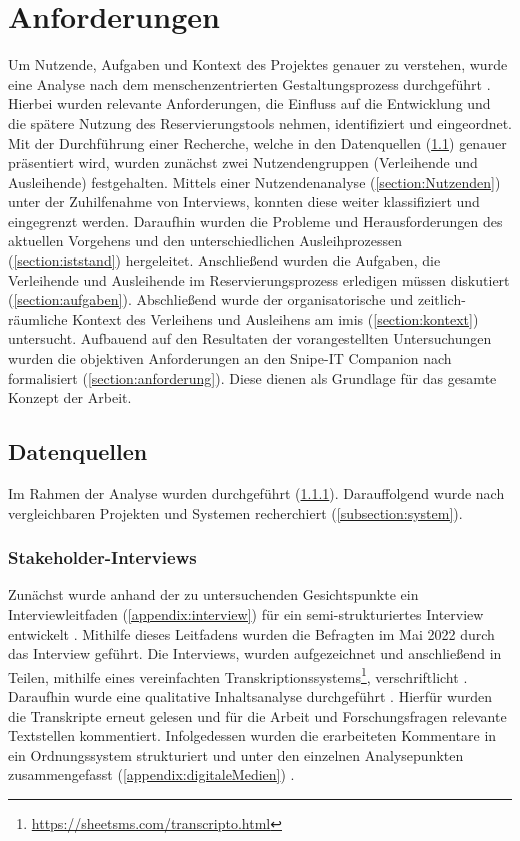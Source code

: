 \chapter{Anforderungen}
\label{chapter-analyse}

Um Nutzende, Aufgaben und Kontext des Projektes genauer zu verstehen, wurde eine
Analyse nach dem menschenzentrierten Gestaltungsprozess durchgeführt
\cite{DINISO9241}. Hierbei wurden relevante Anforderungen, die Einfluss auf die
Entwicklung und die spätere Nutzung des Reservierungstools nehmen, identifiziert
und eingeordnet. Mit der Durchführung einer Recherche, welche in den
Datenquellen (\ref{section:daten}) genauer präsentiert wird, wurden zunächst
zwei Nutzendengruppen (Verleihende und Ausleihende) festgehalten. Mittels einer
Nutzendenanalyse (\ref{section:Nutzenden}) unter der Zuhilfenahme von
Interviews, konnten diese weiter klassifiziert und eingegrenzt werden. Daraufhin
wurden die Probleme und Herausforderungen des aktuellen Vorgehens und den
unterschiedlichen Ausleihprozessen (\ref{section:iststand}) hergeleitet.
Anschließend wurden die Aufgaben, die Verleihende und Ausleihende im
Reservierungsprozess erledigen müssen diskutiert (\ref{section:aufgaben}).
Abschließend wurde der organisatorische und zeitlich-räumliche Kontext des
Verleihens und Ausleihens am \ac{imis} (\ref{section:kontext}) untersucht.
Aufbauend auf den Resultaten der vorangestellten Untersuchungen wurden die
objektiven Anforderungen an den Snipe-IT Companion nach 
formalisiert (\ref{section:anforderung}). Diese dienen als Grundlage für das
gesamte Konzept der Arbeit.

\section{Datenquellen}
\label{section:daten}
Im Rahmen der Analyse wurden  durchgeführt
(\ref{subsection:interview}). Darauffolgend wurde nach vergleichbaren Projekten
und Systemen recherchiert (\ref{subsection:system}).

\subsection{Stakeholder-Interviews}
\label{subsection:interview}
Zunächst wurde anhand der zu untersuchenden Gesichtspunkte ein Interviewleitfaden
(\ref{appendix:interview}) für ein semi-strukturiertes Interview entwickelt
\cite{blandford_qualitative_2016}. Mithilfe dieses Leitfadens wurden die Befragten im Mai 2022 durch
das Interview geführt. Die Interviews, wurden aufgezeichnet und anschließend in Teilen, mithilfe
eines vereinfachten Transkriptionssystems\footnote{\url{https://sheetsms.com/transcripto.html}},
verschriftlicht \cite{dresing_praxisbuch_2016}. Daraufhin wurde eine qualitative Inhaltsanalyse
durchgeführt \cite{dresing_praxisbuch_2016}. Hierfür wurden die Transkripte erneut gelesen und für
die Arbeit und Forschungsfragen relevante Textstellen kommentiert. Infolgedessen wurden die
erarbeiteten Kommentare in ein Ordnungssystem strukturiert und unter den einzelnen Analysepunkten
zusammengefasst (\ref{appendix:digitaleMedien}) \cite{dresing_praxisbuch_2016}.

